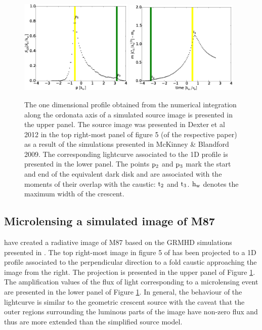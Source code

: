 \documentclass[usenatbib]{mn2e}
\begin{document}
\begin{figure}
\centering
    \includegraphics[width = 0.48\textwidth]{figures/M87_shape.eps}
        \includegraphics[width = 0.48\textwidth]{figures/M87_lc.eps}
\caption{\label{fig:M87_plots} The one dimensional profile obtained
  from the numerical integration along the ordonata axis of a simulated source
  image is presented in the upper panel. The source image was presented in 
 Dexter et al 2012 in the top right-most panel of figure 5 
(of the respective paper) as a result of the simulations 
presented in McKinney \& Blandford 2009. The corresponding
  lightcurve associated to the 1D profile is presented in the lower
  panel. The points $\rm p_2$ and $\rm p_3$ mark the start and 
  end of the equivalent
  dark disk and are associated with the moments of their overlap with
  the caustic: $\rm t_2$ and $\rm t_3$. $\rm h_{w}$ denotes the maximum width of the crescent.}
\end{figure}


\subsection{Microlensing a simulated image of M87}

\cite{2012MNRAS.421.1517D} have created a radiative image of M87 based on the GRMHD simulations presented in \citep{2009MNRAS.394L.126M}. 
The top right-most image in figure 5 of \cite{2012MNRAS.421.1517D} has been projected to a 1D profile associated to the perpendicular 
direction to a fold caustic approaching the image from the right. The projection is presented in the upper panel of Figure \ref{fig:M87_plots}. 
The amplification values of the flux of light corresponding to a 
microlensing event are presented in the lower panel of Figure \ref{fig:M87_plots}. 
In general, the behaviour of the lightcurve is similar to the geometric crescent source with the caveat that the outer regions 
surrounding the luminous parts of the image have non-zero flux and thus are more extended than the simplified source model.
\end{document}
